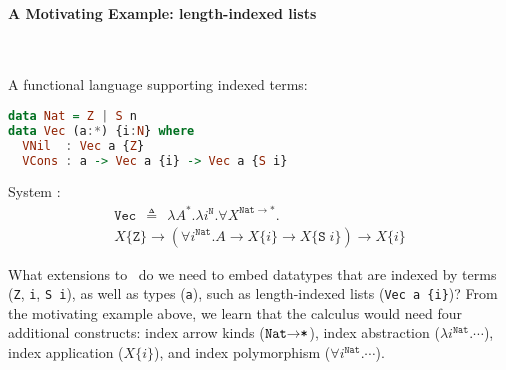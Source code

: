 \paragraph{A Motivating Example: length-indexed lists}~\vspace*{-14pt}\\
\begin{framed}\vspace*{-4pt}\noindent
A functional language supporting indexed terms: \vspace*{-4.5pt}
\begin{lstlisting}[basicstyle={\ttfamily},language=Haskell]
data Nat = Z | S n
data Vec (a:*) {i:N} where
  VNil  : Vec a {Z}
  VCons : a -> Vec a {i} -> Vec a {S i}
\end{lstlisting}\noindent
System \Fi: \vspace*{-7pt}
\begin{multline*}\!\!\!\!\!\!\!
\texttt{{Vec}}\:\:\triangleq\:\:\lambda A^{*}.\lambda i^{\texttt{{N}}}.
\forall X^{\texttt{{Nat}}\to*}.\\
X\{\texttt{{Z}}\}\to
(\forall i^{\texttt{{Nat}}}.A\to X\{i\}\to X\{\texttt{{S}}\; i\})\to X\{i\}
\!\!\!\!\!\!\!\!\!
\end{multline*}\vspace*{-20pt}
\end{framed}\vspace*{-5pt}\noindent
What extensions to \Fw\ do we need to embed datatypes that are indexed by
terms (\texttt{Z}, \texttt{i}, \texttt{S i}), as well as types (\texttt{a}),
such as length-indexed lists (\verb|Vec a {i}|)? From the motivating example
above, we learn that the calculus would need four additional constructs:
index arrow kinds ($\texttt{{Nat}\ensuremath{\to}*}$),
index abstraction ($\lambda i^{\texttt{{Nat}}}.\cdots$),
index application ($X\{i\}$), and
index polymorphism ($\forall i^{\texttt{{Nat}}}.\cdots$).


